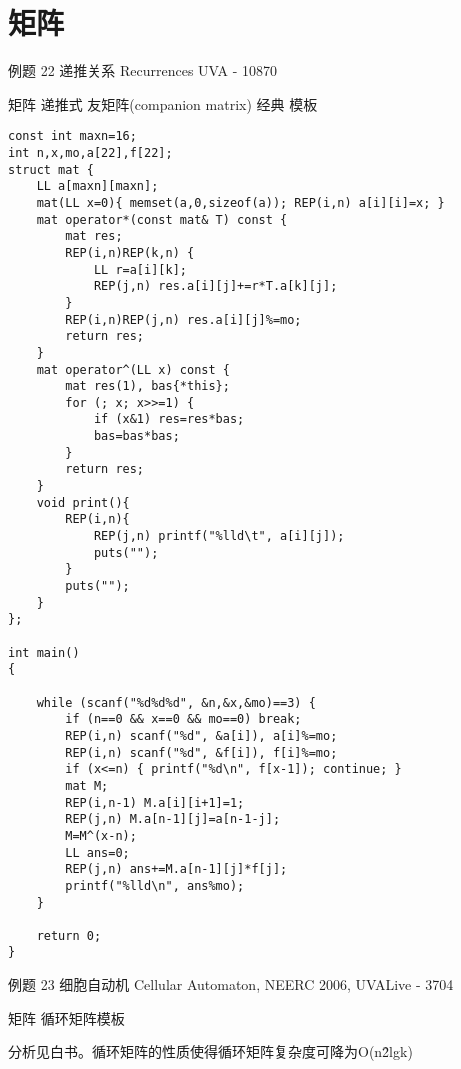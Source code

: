 \section{矩阵}

例题 22 递推关系 Recurrences UVA - 10870

矩阵 递推式 友矩阵(companion matrix) 经典 模板

\begin{lstlisting}
const int maxn=16;
int n,x,mo,a[22],f[22];
struct mat {
    LL a[maxn][maxn];
    mat(LL x=0){ memset(a,0,sizeof(a)); REP(i,n) a[i][i]=x; }
    mat operator*(const mat& T) const {
        mat res;
        REP(i,n)REP(k,n) {
            LL r=a[i][k];
            REP(j,n) res.a[i][j]+=r*T.a[k][j];
        }
        REP(i,n)REP(j,n) res.a[i][j]%=mo;
        return res;
    }
    mat operator^(LL x) const {
        mat res(1), bas{*this};
        for (; x; x>>=1) {
            if (x&1) res=res*bas;
            bas=bas*bas;
        }
        return res;
    }
    void print(){
        REP(i,n){
            REP(j,n) printf("%lld\t", a[i][j]);
            puts("");
        }
        puts("");
    }
};

int main()
{

    while (scanf("%d%d%d", &n,&x,&mo)==3) {
        if (n==0 && x==0 && mo==0) break;
        REP(i,n) scanf("%d", &a[i]), a[i]%=mo;
        REP(i,n) scanf("%d", &f[i]), f[i]%=mo;
        if (x<=n) { printf("%d\n", f[x-1]); continue; }
        mat M;
        REP(i,n-1) M.a[i][i+1]=1;
        REP(j,n) M.a[n-1][j]=a[n-1-j];
        M=M^(x-n);
        LL ans=0;
        REP(j,n) ans+=M.a[n-1][j]*f[j];
        printf("%lld\n", ans%mo);
    }

    return 0;
}
\end{lstlisting}

例题 23 细胞自动机 Cellular Automaton, NEERC 2006, UVALive - 3704

矩阵 循环矩阵模板

分析见白书。循环矩阵的性质使得循环矩阵复杂度可降为O(n\^2lgk)

